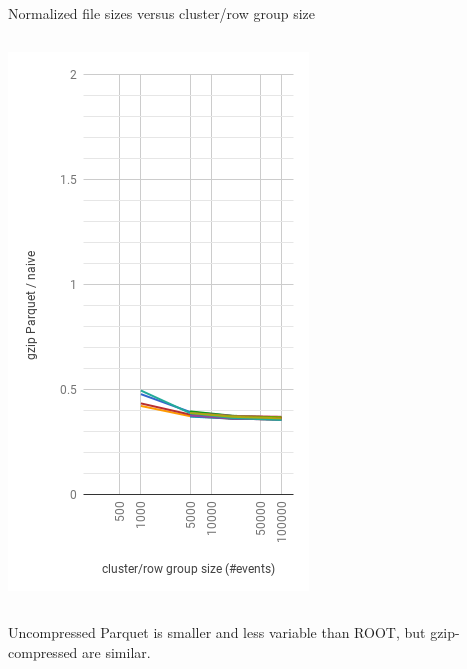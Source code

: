 \documentclass[aspectratio=169]{beamer}
\begin{document}
\begin{frame}{Normalized file sizes versus cluster/row group size}
\begin{columns}
\begin{center}
\includegraphics[width=\linewidth]{parquet-gzip.png}
\end{center}
\end{columns}

\vspace{0.25 cm}
Uncompressed Parquet is smaller and less variable than ROOT, but gzip-compressed are similar.
\end{frame}
\end{document}
